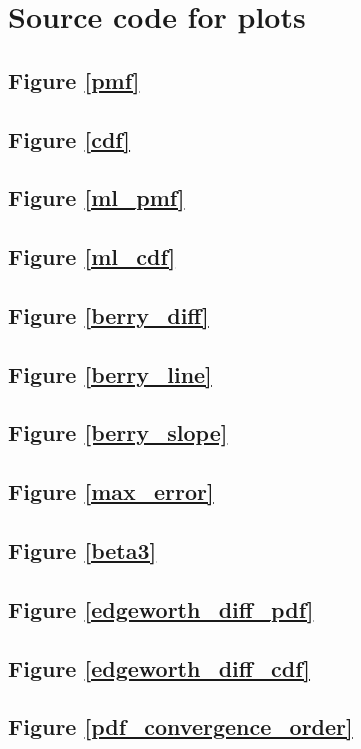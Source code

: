 \chapter{Source code for plots}

\newcommand*{\src}[1]{\section{Figure \ref{#1}}

}

\src{pmf}
\src{cdf}
\src{ml_pmf}
\src{ml_cdf}
\src{berry_diff}
\src{berry_line}
\src{berry_slope}
\src{max_error}
\src{beta3}
\src{edgeworth_diff_pdf}
\src{edgeworth_diff_cdf}
\src{pdf_convergence_order}
